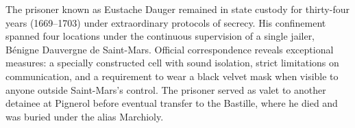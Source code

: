 The prisoner known as \QSOpen{}Eustache Dauger\QSClose{} remained in state custody for thirty-four years (1669–1703) under extraordinary protocols of secrecy. His confinement spanned four locations under the continuous supervision of a single jailer, Bénigne Dauvergne de Saint-Mars. Official correspondence reveals exceptional measures: a specially constructed cell with sound isolation, strict limitations on communication, and a requirement to wear a black velvet mask when visible to anyone outside Saint-Mars's control. The prisoner served as valet to another detainee at Pignerol before eventual transfer to the Bastille, where he died and was buried under the alias \QSOpen{}Marchioly.\QSClose{}